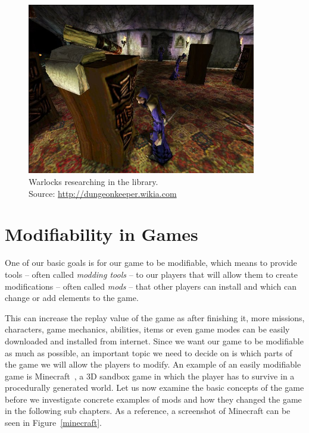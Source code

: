 \begin{figure}[H]
    \centering
    \includegraphics[width=10cm]{../img/library.jpg}
    \caption{Warlocks researching in the library.
             \\Source: \href{http://vignette2.wikia.nocookie.net/dungeonkeeper/images/9/98/Library.jpg/revision/latest?cb=20120808211437}{http://dungeonkeeper.wikia.com}}
    \label{dk-lib}
\end{figure}

\section{Modifiability in Games}

One of our basic goals is for our game to be modifiable, which means to provide tools -- often called \emph{modding tools} -- to our players
that will allow them to create modifications -- often called \emph{mods} -- that other players can install and which can change or
add elements to the game.

This can increase the replay value of the game as after finishing it, more missions, characters, game mechanics, abilities, items
or even game modes can be easily downloaded and installed from internet. Since we want our game to be modifiable as much as
possible, an important topic we need to decide on is which parts of the game we will allow the players to modify. 
An example of an easily modifiable game is Minecraft~\cite{Minecraft}, a 3D sandbox game 
in which the player has to survive in a procedurally generated world. Let us now examine the basic concepts of the game before
we investigate concrete examples of mods and how they changed the game in the following sub chapters. 
As a reference, a screenshot of Minecraft can be seen in Figure~\ref{minecraft}. 

